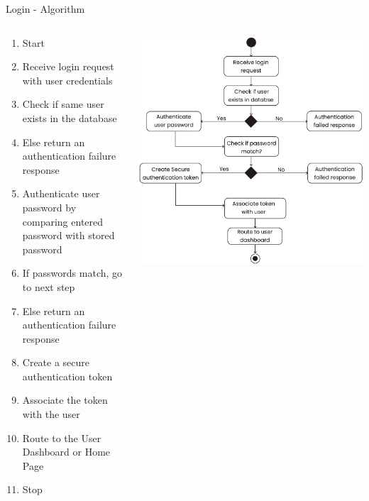 \documentclass{beamer}
\begin{document}
  \begin{frame}{Login - Algorithm}
  \setlength{\itemsep}{4pt}
   \begin{columns}[T]
        \begin{column}{0.5\textwidth}
        \fontsize{7}{9}\selectfont
        \begin{enumerate}
            \item Start
            \item Receive login request with user credentials 
            \item Check if same user exists in the database
            \item Else return an authentication failure response
            \item Authenticate user password by comparing entered password with stored password
            \item If passwords match, go to next step
            \item Else return an authentication failure response
            \item Create a secure authentication token
            \item Associate the token with the user 
            \item Route to the User Dashboard or Home Page
            \item Stop
        \end{enumerate}
        \end{column}
        \begin{column}{0.6\textwidth}
            \includegraphics[width=\linewidth]{assets/login_state_chart.png} 
        \end{column}
    \end{columns}
    \end{frame}
\end{document}
